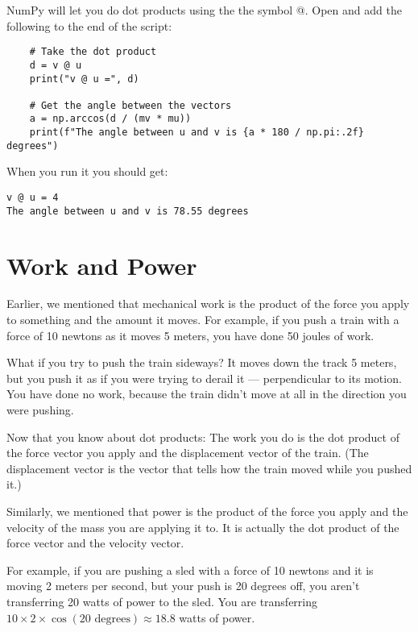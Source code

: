 NumPy will let you do dot products using the the symbol @.  Open  
and add the following to the end of the script:

\begin{Verbatim}
    # Take the dot product
    d = v @ u
    print("v @ u =", d)
    
    # Get the angle between the vectors
    a = np.arccos(d / (mv * mu))
    print(f"The angle between u and v is {a * 180 / np.pi:.2f} degrees")    
\end{Verbatim}

When you run it you should get:
\begin{Verbatim}
v @ u = 4
The angle between u and v is 78.55 degrees
\end{Verbatim}

\section{Work and Power}
Earlier, we mentioned that mechanical work is the product of the 
force you apply to something and the amount it moves. For example, if you 
push a train with a force of 10 newtons as it moves 5 meters, you have done 50 joules of work.

What if you try to push the train sideways? It moves down the track 5 meters, 
but you push it as if you were trying to derail it --- perpendicular to its motion.  
You have done no work, because the train didn't move at all in the direction you were pushing.



Now that you know about dot products: The work you do is the dot
product of the force vector you apply and the displacement vector of the train. (The displacement
vector is the vector that tells how the train moved while you pushed it.) 

Similarly, we mentioned that power is the product of the force you apply and the velocity of the
mass you are applying it to. It is actually the dot product of the force vector and the velocity vector.

For example, if you are pushing a sled with a force of 10 newtons and it is moving 2 meters per second, 
but your push is 20 degrees off, you aren't transferring 20 watts of power to the sled.  
You are transferring $10 \times 2 \times \cos(20 \text{ degrees}) \approx 18.8$ watts of power.

